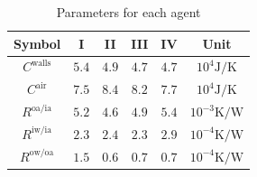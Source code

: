 \documentclass[../main.tex]{subfiles}
\begin{document}
\begin{table}[b]
  \centering
  \caption{
    Parameters for each agent}\label{tab:modelParam}
  \begin{tabular}[t]{cccccc} \toprule
    Symbol& I & II & III & IV &Unit\\
    \midrule
    $C^{\text{walls}}$   &$5.4$&$4.9$&$4.7$&$4.7$ &$10^{4}\mathrm{J/K}$ \\
    $C^{\text{air}}$     &$7.5$ &$8.4 $&$8.2$ &$7.7$&$10^{4}\mathrm{J/K}$  \\
    $R^{\text{oa/ia}}$   &$5.2$&$4.6$&$4.9$&$5.4$&$10^{-3}\mathrm{K/W}$ \\
    $R^{\text{iw/ia}}$   &$2.3$&$2.4$&$2.3$&$2.9$&$10^{-4}\mathrm{K/W}$\\
    $R^{\text{ow/oa}}$   &$1.5$&$0.6$&$0.7$&$0.7$& $10^{-4}\mathrm{K/W}$ \\
    \bottomrule
  \end{tabular}
\end{table}
\end{document}
